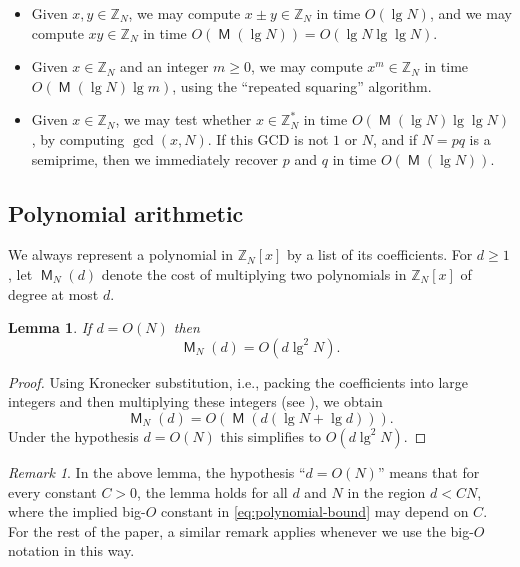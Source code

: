 \documentclass[reqno]{amsart}
\newtheorem{lem}[thm]{Lemma}
\theoremstyle{remark}
\newtheorem{rem}[thm]{Remark}
\numberwithin{equation}{section}
\numberwithin{thm}{section}
\newcommand{\ZZ}{\mathbb{Z}}
\DeclareMathOperator{\MM}{\mathsf{M}}
\renewcommand{\geq}{\geqslant}
\begin{document}
\begin{itemize}
  \item
  Given $x, y \in \ZZ_N$,
  we may compute $x \pm y \in \ZZ_N$ in time $O(\lg N)$,
  and we may compute $xy \in \ZZ_N$ in time $O(\MM(\lg N)) = O(\lg N \lg \lg N)$.

  \item
  Given $x \in \ZZ_N$ and an integer $m \geq 0$,
  we may compute $x^m \in \ZZ_N$ in time $O(\MM(\lg N) \lg m)$,
  using the ``repeated squaring'' algorithm.

  \item
  Given $x \in \ZZ_N$, we may test whether $x \in \ZZ_N^*$
  in time $O(\MM(\lg N) \lg \lg N)$, by computing $\gcd(x, N)$.
  If this GCD is not $1$ or $N$,
  and if $N = pq$ is a semiprime,
  then we immediately recover $p$ and $q$ in time $O(\MM(\lg N))$.
\end{itemize}


\subsection{Polynomial arithmetic}

We always represent a polynomial in $\ZZ_N[x]$ by a list of its coefficients.
For $d \geq 1$, let $\MM_N(d)$ denote the cost of multiplying two polynomials
in $\ZZ_N[x]$ of degree at most $d$.
\begin{lem}
\label{lem:polynomial-bound}
  If $d = O(N)$ then
  \begin{equation}
  \label{eq:polynomial-bound}
  \MM_N(d) = O(d \lg^2 N).
  \end{equation}
\end{lem}
\begin{proof}
Using Kronecker substitution, i.e., packing the coefficients into large
integers and then multiplying these integers
(see \cite[Cor.~8.27]{vzGG-compalg3}), we obtain
  \[ \MM_N(d) = O(\MM(d (\lg N + \lg d))). \]
Under the hypothesis $d = O(N)$ this simplifies to $O(d \lg^2 N)$.
\end{proof}
\begin{rem}
  In the above lemma,
  the hypothesis ``$d = O(N)$'' means that for every constant $C > 0$,
  the lemma holds for all $d$ and $N$ in the region $d < CN$,
  where the implied big-$O$ constant in \eqref{eq:polynomial-bound}
  may depend on $C$.
  For the rest of the paper, a similar remark applies whenever we use
  the big-$O$ notation in this way.
\end{rem}
\end{document}
